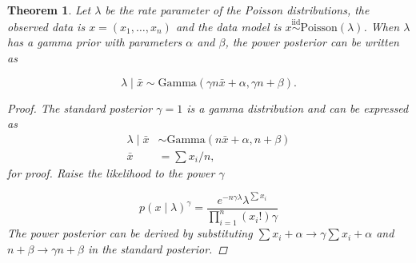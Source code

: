 \documentclass[12pt]{article}
\newtheorem{theorem}{Theorem}
\begin{document}
	\begin{theorem}
		\label{proof:poisson_gamma}
		Let $\lambda$ be the rate parameter of the Poisson distributions, the observed data is $x = (x_1,\ldots, x_n)$ and the data model is $x \overset{\mathrm{iid}}{\sim} \text{Poisson}(\lambda)$. When $\lambda$ has a gamma prior with parameters $\alpha$ and $\beta$, the power posterior can be written as
		
		\begin{equation*}
			\lambda \mid \bar{x} \sim \mathrm{Gamma}\left(\gamma  n \bar{x} + \alpha, \gamma n + \beta\right).
		\end{equation*}
		
		\begin{proof} 
			The standard posterior $\gamma=1$ is a gamma distribution and can be expressed as 
			\begin{align*}
				\lambda \mid  \bar{x} &\sim \text{Gamma}\left( n \bar{x} + \alpha, n + \beta\right)\\
				\bar{x}&=\sum x_i/n,
			\end{align*}
			\cite[see e.g.][]{gelman_bayesian_2020} for proof.
			Raise the likelihood to the power $\gamma$ 
			
			\begin{equation}
				p(x\mid\lambda)^\gamma = \frac{e^{-n \gamma \lambda}\lambda^{\sum x_i}}{\prod_{i=1}^n(x_i !)\gamma}
			\end{equation}
			The power posterior can be derived by substituting 
			$\sum x_i + \alpha \to  \gamma \sum x_i + \alpha$ and  $n + \beta \to  \gamma n + \beta$ in the standard posterior.
		\end{proof}
	\end{theorem}



\end{document}
